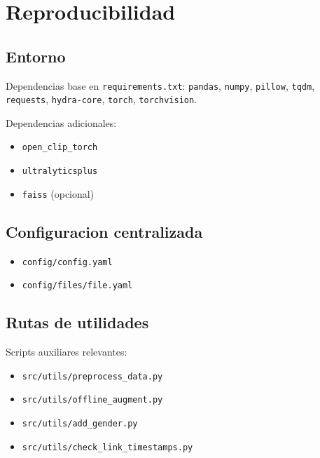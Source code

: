 \section{Reproducibilidad}

\subsection{Entorno}

Dependencias base en \texttt{requirements.txt}: \texttt{pandas}, \texttt{numpy}, \texttt{pillow}, \texttt{tqdm}, \texttt{requests}, \texttt{hydra-core}, \texttt{torch}, \texttt{torchvision}.

Dependencias adicionales:
\begin{itemize}
  \item \texttt{open\_clip\_torch}
  \item \texttt{ultralyticsplus}
  \item \texttt{faiss} (opcional)
\end{itemize}

\subsection{Configuracion centralizada}

\begin{itemize}
  \item \texttt{config/config.yaml}
  \item \texttt{config/files/file.yaml}
\end{itemize}

\subsection{Rutas de utilidades}

Scripts auxiliares relevantes:
\begin{itemize}
  \item \texttt{src/utils/preprocess\_data.py}
  \item \texttt{src/utils/offline\_augment.py}
  \item \texttt{src/utils/add\_gender.py}
  \item \texttt{src/utils/check\_link\_timestamps.py}
\end{itemize}
